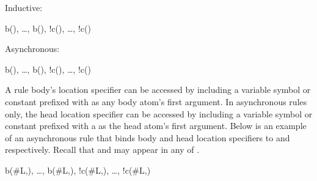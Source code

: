 Inductive:

\begin{Drules}
        {b(), \ldots, b(), !c(), \ldots, !c()}
\end{Drules}

Asynchronous:

\begin{Drules}
        {b(), \ldots, b(), !c(), \ldots, !c()}
\end{Drules}

A rule body's location specifier can be accessed by including a variable symbol or constant prefixed with \dedalus{#} as any body atom's first argument.  In asynchronous rules only, the head location specifier can be accessed by including a variable symbol or constant prefixed with a \dedalus{#} as the head atom's first argument.  Below is an example of an asynchronous rule that binds body and head location specifiers to  and  respectively.  Recall that  and  may appear in any of .  

\begin{Drules}
        {b(#L,), \ldots, b(#L,), !c(#L,), \ldots, !c(#L,)}
\end{Drules}





